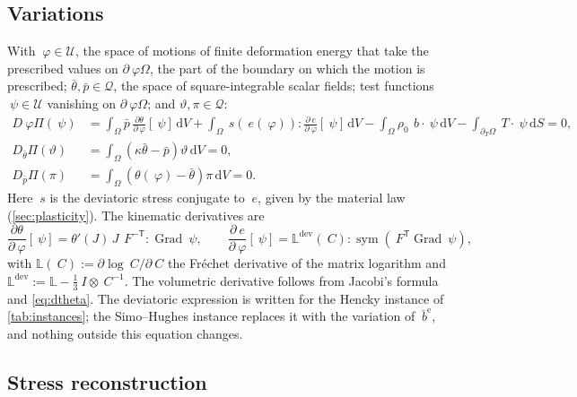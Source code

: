 \documentclass{article}
\newcommand{\F}{~F}
\newcommand{\C}{~C}
\newcommand{\Id}{~I}
\newcommand{\edev}{~e}
\newcommand{\sdev}{~s}
\newcommand{\disp}{~\varphi}
\newcommand{\testd}{~\psi}
\newcommand{\bT}{~T}
\newcommand{\Grad}{\operatorname{Grad}}
\newcommand{\sym}{\operatorname{sym}}
\newcommand{\transpose}[1]{#1^{\mathsf{T}}}
\newcommand{\diff}{\,\mathrm{d}}
\newcommand{\supdev}{^{\mathrm{dev}}}
\theoremstyle{definition}
\theoremstyle{plain}
\begin{document}
\subsection{Variations}
\label{sec:variations}

With $\disp \in \mathcal{U}$, the space of motions of finite deformation
energy that take the prescribed values on $\partial_\disp\Omega$, the part of
the boundary on which the motion is prescribed; $\bar\theta, \bar p \in
\mathcal{Q}$, the space of square-integrable scalar fields; test functions
$\testd \in \mathcal{U}$ vanishing on $\partial_\disp\Omega$; and
$\vartheta, \pi \in \mathcal{Q}$:
\begin{equation}
  \label{eq:variations}
  \begin{split}
    D_\disp \Pi(\testd) & =
      \int_\Omega \bar p \, \frac{\partial\theta}{\partial\disp}[\testd] \diff V
      + \int_\Omega \sdev\!\left(\edev(\disp)\right) : \frac{\partial\edev}{\partial\disp}[\testd] \diff V
      - \int_\Omega \rho_0\,~b\cdot\testd \diff V
      - \int_{\partial_T\Omega} \bT\cdot\testd \diff S = 0,
    \\
    D_{\bar\theta}\Pi(\vartheta) & =
      \int_\Omega \left( \kappa\bar\theta - \bar p \right)\vartheta \diff V = 0,
    \\
    D_{\bar p}\Pi(\pi) & =
      \int_\Omega \left( \theta(\disp) - \bar\theta \right)\pi \diff V = 0 .
  \end{split}
\end{equation}
Here $\sdev$ is the deviatoric stress conjugate to $\edev$, given by the
material law (\cref{sec:plasticity}). The kinematic derivatives are
\begin{equation}
  \label{eq:kinematic}
  \frac{\partial\theta}{\partial\disp}[\testd]
    = \theta'(J)\, J\, \F^{-\mathsf{T}} : \Grad\testd,
  \qquad
  \frac{\partial\edev}{\partial\disp}[\testd]
    = \mathbb{L}\supdev(\C) : \sym\!\left(\transpose{\F}\Grad\testd\right),
\end{equation}
with $\mathbb{L}(\C) := \partial \log\C/\partial\C$ the Fr\'echet derivative of
the matrix logarithm \cite{AlMohy.Higham.Relton:2013} and
$\mathbb{L}\supdev := \mathbb{L} - \tfrac13 \Id \otimes \C^{-1}$. The
volumetric derivative follows from Jacobi's formula and \eqref{eq:dtheta}. The
deviatoric expression is written for the Hencky instance of
\cref{tab:instances}; the Simo--Hughes instance replaces it with the
variation of $\bar{~b}^{\mathrm e}$, and nothing outside this equation
changes.

\subsection{Stress reconstruction}
\label{sec:stress}
\end{document}
